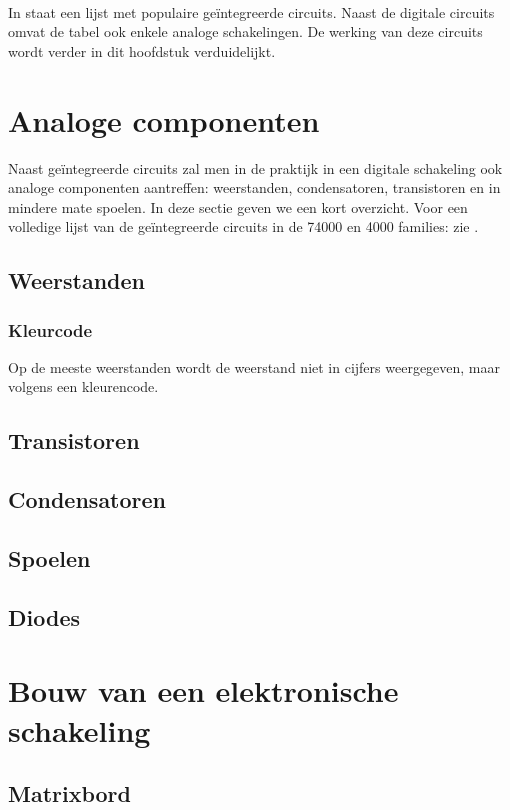 \paragraph{}
In  staat een lijst met populaire ge\"integreerde circuits. Naast de digitale circuits omvat de tabel ook enkele analoge schakelingen. De werking van deze circuits wordt verder in dit hoofdstuk verduidelijkt.
\section{Analoge componenten}
Naast ge\"integreerde circuits zal men in de praktijk in een digitale schakeling ook analoge componenten aantreffen: weerstanden, condensatoren, transistoren en in mindere mate spoelen. In deze sectie geven we een kort overzicht. Voor een volledige lijst van de ge\"integreerde circuits in de 74000 en 4000 families: zie \cite{74000icfamily,4000icfamily}.
\subsection{Weerstanden}
\subsubsection{Kleurcode}
Op de meeste weerstanden wordt de weerstand niet in cijfers weergegeven, maar volgens een kleurencode.
\subsection{Transistoren}
\subsection{Condensatoren}
\subsection{Spoelen}
\subsection{Diodes}
\section{Bouw van een elektronische schakeling}
\subsection{Matrixbord}
